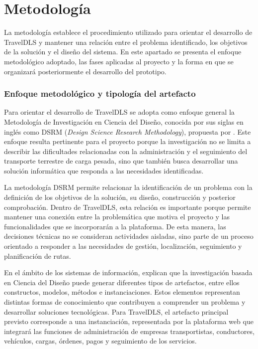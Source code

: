 
\section{Metodología}
\label{sec:metodologia}

La metodología establece el procedimiento utilizado para orientar el desarrollo de TravelDLS y mantener una relación entre el problema identificado, los objetivos de la solución y el diseño del sistema. En este apartado se presenta el enfoque metodológico adoptado, las fases aplicadas al proyecto y la forma en que se organizará posteriormente el desarrollo del prototipo.

\subsubsection{Enfoque metodológico y tipología del artefacto}
\label{sec:metodo-enfoque}

Para orientar el desarrollo de TravelDLS se adopta como enfoque general la Metodología de Investigación en Ciencia del Diseño, conocida por sus siglas en inglés como DSRM (\textit{Design Science Research Methodology}), propuesta por \textcite{peffers2007dsrm}. Este enfoque resulta pertinente para el proyecto porque la investigación no se limita a describir las dificultades relacionadas con la administración y el seguimiento del transporte terrestre de carga pesada, sino que también busca desarrollar una solución informática que responda a las necesidades identificadas.

La metodología DSRM permite relacionar la identificación de un problema con la definición de los objetivos de la solución, su diseño, construcción y posterior comprobación. Dentro de TravelDLS, esta relación es importante porque permite mantener una conexión entre la problemática que motiva el proyecto y las funcionalidades que se incorporarán a la plataforma. De esta manera, las decisiones técnicas no se consideran actividades aisladas, sino parte de un proceso orientado a responder a las necesidades de gestión, localización, seguimiento y planificación de rutas.

En el ámbito de los sistemas de información, \textcite{hevner2004design} explican que la investigación basada en Ciencia del Diseño puede generar diferentes tipos de artefactos, entre ellos constructos, modelos, métodos e instanciaciones. Estos elementos representan distintas formas de conocimiento que contribuyen a comprender un problema y desarrollar soluciones tecnológicas. Para TravelDLS, el artefacto principal previsto corresponde a una instanciación, representada por la plataforma web que integrará las funciones de administración de empresas transportistas, conductores, vehículos, cargas, órdenes, pagos y seguimiento de los servicios.

